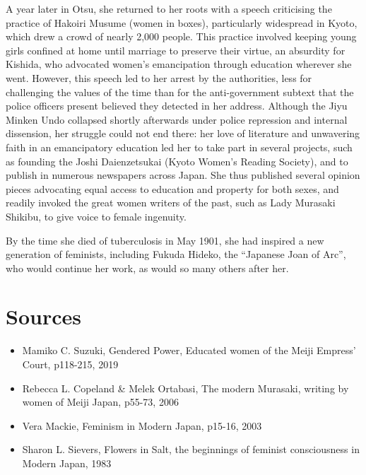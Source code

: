 \documentclass[11pt,a4paper]{article}
\begin{document}
A year later in Otsu, she returned to her roots with a speech criticising the practice of Hakoiri Musume (women in boxes), particularly widespread in Kyoto, which drew a crowd of nearly 2,000 people. This practice involved keeping young girls confined at home until marriage to preserve their virtue, an absurdity for Kishida, who advocated women's emancipation through education wherever she went. However, this speech led to her arrest by the authorities, less for challenging the values of the time than for the anti-government subtext that the police officers present believed they detected in her address. Although the Jiyu Minken Undo collapsed shortly afterwards under police repression and internal dissension, her struggle could not end there: her love of literature and unwavering faith in an emancipatory education led her to take part in several projects, such as founding the Joshi Daienzetsukai (Kyoto Women's Reading Society), and to publish in numerous newspapers across Japan. She thus published several opinion pieces advocating equal access to education and property for both sexes, and readily invoked the great women writers of the past, such as Lady Murasaki Shikibu, to give voice to female ingenuity.

By the time she died of tuberculosis in May 1901, she had inspired a new generation of feminists, including Fukuda Hideko, the ``Japanese Joan of Arc'', who would continue her work, as would so many others after her.

\section{Sources}
\small

\begin{itemize}[leftmargin=1.3em,itemsep=.18em,topsep=.25em]
\item
  Mamiko C. Suzuki, Gendered Power, Educated women of the Meiji Empress' Court, p118-215, 2019
\item
  Rebecca L. Copeland \& Melek Ortabasi, The modern Murasaki, writing by women of Meiji Japan, p55-73, 2006
\item
  Vera Mackie, Feminism in Modern Japan, p15-16, 2003
\item
  Sharon L. Sievers, Flowers in Salt, the beginnings of feminist consciousness in Modern Japan, 1983
\end{itemize}
\end{document}
